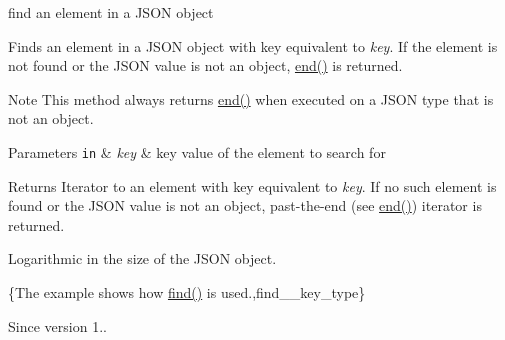 find an element in a J\+S\+ON object 

Finds an element in a J\+S\+ON object with key equivalent to {\itshape key}. If the element is not found or the J\+S\+ON value is not an object, \mbox{\hyperlink{classnlohmann_1_1basic__json_a13e032a02a7fd8a93fdddc2fcbc4763c}{end()}} is returned.

\begin{DoxyNote}{Note}
This method always returns \mbox{\hyperlink{classnlohmann_1_1basic__json_a13e032a02a7fd8a93fdddc2fcbc4763c}{end()}} when executed on a J\+S\+ON type that is not an object.
\end{DoxyNote}

\begin{DoxyParams}[1]{Parameters}
\mbox{\tt in}  & {\em key} & key value of the element to search for\\
\hline
\end{DoxyParams}
\begin{DoxyReturn}{Returns}
Iterator to an element with key equivalent to {\itshape key}. If no such element is found or the J\+S\+ON value is not an object, past-\/the-\/end (see \mbox{\hyperlink{classnlohmann_1_1basic__json_a13e032a02a7fd8a93fdddc2fcbc4763c}{end()}}) iterator is returned.
\end{DoxyReturn}
Logarithmic in the size of the J\+S\+ON object.

\{The example shows how {\ttfamily \mbox{\hyperlink{classnlohmann_1_1basic__json_aeed33787bd362c7ead59a4ba945392db}{find()}}} is used.,find\+\_\+\+\_\+key\+\_\+type\}

\begin{DoxySince}{Since}
version 1.. 
\end{DoxySince}
\mbox{\label{classnlohmann_1_1basic__json_a6d2f26a0a84787a43c989c88e2b7023b}} 
